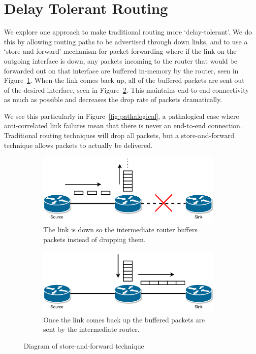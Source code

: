 \documentclass[withindex,glossary,openany]{cam-thesis}
\begin{document}
\section{Delay Tolerant Routing}
We explore one approach to make traditional routing more `delay-tolerant'. We do this by allowing routing paths to be advertised through down links, and to use a `store-and-forward' mechanism for packet forwarding where if the link on the outgoing interface is down, any packets incoming to the router that would be forwarded out on that interface are buffered in-memory by the router, seen in Figure~\ref{fig:saf_down}. When the link comes back up, all of the buffered packets are sent out of the desired interface, seen in Figure~\ref{fig:saf_up}. This maintains end-to-end connectivity as much as possible and decreases the drop rate of packets dramatically.

We see this particularly in Figure~\ref{fig:pathalogical}, a pathalogical case where anti-correlated link failures mean that there is never an end-to-end connection. Traditional routing techniques will drop all packets, but a store-and-forward technique allows packets to actually be delivered.

\begin{center}
\begin{minipage}{0.9\textwidth} \centering
\begin{figure}[H]
\centering
\begin{subfigure}{.65\textwidth}
  \centering
  \includegraphics[width=1\linewidth]{storeandforward_down}
  \caption{The link is down so the intermediate router buffers packets instead of dropping them.}
  \label{fig:saf_down}
\end{subfigure}
\begin{subfigure}{.65\textwidth}
  \centering
  \includegraphics[width=1\linewidth]{storeandforward_up}
  \caption{Once the link comes back up the buffered packets are sent by the intermediate router.}
  \label{fig:saf_up}
\end{subfigure}
\caption{Diagram of store-and-forward technique}
\label{fig:saf}
\end{figure}
\end{minipage}
\end{center}
\end{document}
